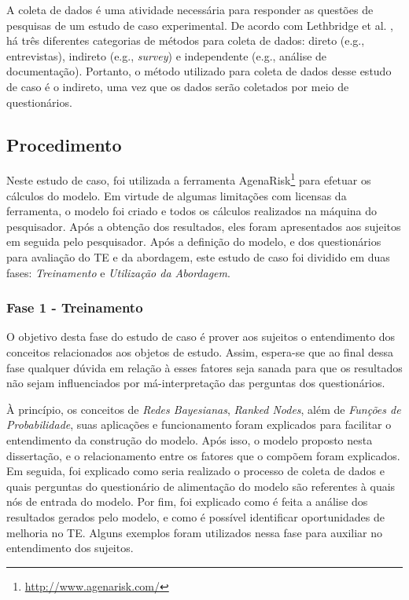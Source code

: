 A coleta de dados é uma atividade necessária para responder as questões de pesquisas de um estudo de caso experimental. De acordo com Lethbridge et al. \cite{lethbridge}, há três diferentes categorias de métodos para coleta de dados: direto (e.g., entrevistas), indireto (e.g., \textit{survey}) e independente (e.g., análise de documentação). Portanto, o método utilizado para coleta de dados desse estudo de caso é o indireto, uma vez que os dados serão coletados por meio de questionários.

\subsection{Procedimento}
\label{estudodecaso:design:procedimento}

Neste estudo de caso, foi utilizada a ferramenta AgenaRisk\footnote{\url{http://www.agenarisk.com/}} para efetuar os cálculos do modelo. Em virtude de algumas limitações com licensas da ferramenta, o modelo foi criado e todos os cálculos realizados na máquina do pesquisador. Após a obtenção dos resultados, eles foram apresentados aos sujeitos em seguida pelo pesquisador. Após a definição do modelo, e dos questionários para avaliação do TE e da abordagem, este estudo de caso foi dividido em duas fases: \textit{Treinamento} e \textit{Utilização da Abordagem}.

\subsubsection{Fase 1 - Treinamento}
\label{estudodecaso:design:procedimento:treinamento}

O objetivo desta fase do estudo de caso é prover aos sujeitos o entendimento dos conceitos relacionados aos objetos de estudo. Assim, espera-se que ao final dessa fase qualquer dúvida em relação à esses fatores seja sanada para que os resultados não sejam influenciados por má-interpretação das perguntas dos questionários.

À princípio, os conceitos de \textit{Redes Bayesianas}, \textit{Ranked Nodes}, além de \textit{Funções de Probabilidade}, suas aplicações e funcionamento foram explicados para facilitar o entendimento da construção do modelo. Após isso, o modelo proposto nesta dissertação, e o relacionamento entre os fatores que o compõem foram explicados. Em seguida, foi explicado como seria realizado o processo de coleta de dados e quais perguntas do questionário de alimentação do modelo são referentes à quais nós de entrada do modelo. Por fim, foi explicado como é feita a análise dos resultados gerados pelo modelo, e como é possível identificar oportunidades de melhoria no TE. Alguns exemplos foram utilizados nessa fase para auxiliar no entendimento dos sujeitos.

